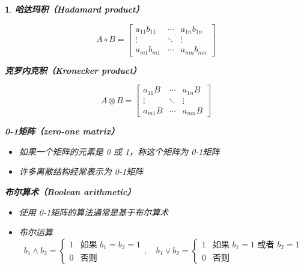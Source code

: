 \documentclass[UTF8]{report}
\theoremstyle{MyLineTheoremStyle} %
\theoremstyle{MyBlockTheoremStyle} %
\theoremstyle{MySubsubsectionStyle} %
\newtheorem{definition}{}
\begin{document}
\begin{definition}
    
        \textbf{哈达玛积（Hadamard product）}\par
        \[
        A \circ B =
        \begin{bmatrix}
        a_{11}b_{11} & \cdots & a_{1n}b_{1n} \\
        \vdots & \ddots & \vdots \\
        a_{m1}b_{m1} & \cdots & a_{mn}b_{mn}
        \end{bmatrix}
        \]
        
        \textbf{克罗内克积（Kronecker product）}\par
        \[
        A \otimes B =
        \begin{bmatrix}
        a_{11}B & \cdots & a_{1n}B \\
        \vdots & \ddots & \vdots \\
        a_{m1}B & \cdots & a_{mn}B
        \end{bmatrix}
        \]
    
        \textbf{0-1矩阵（zero-one matrix）}\par
        \begin{itemize}
            \item 如果一个矩阵的元素是 0 或 1，称这个矩阵为 0-1矩阵
            \item 许多离散结构经常表示为 0-1矩阵
        \end{itemize}
        \textbf{布尔算术（Boolean arithmetic）}\par
        \begin{itemize}
            \item 使用 0-1矩阵的算法通常是基于布尔算术
            \item 布尔运算
            \[
            b_1 \land b_2 = 
            \begin{cases}
            1 & \text{如果 } b_1 = b_2 = 1 \\
            0 & \text{否则}
            \end{cases}
            , \quad
            b_1 \lor b_2 = 
            \begin{cases}
            1 & \text{如果 } b_1 = 1 \text{ 或者 } b_2 = 1 \\
            0 & \text{否则}
            \end{cases}
            \]
        \end{itemize}


\end{definition}
\end{document}
